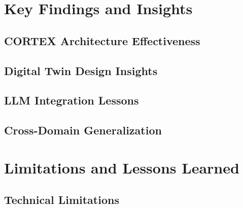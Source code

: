 \section{Key Findings and Insights}

\subsection{CORTEX Architecture Effectiveness}

\subsection{Digital Twin Design Insights}

\subsection{LLM Integration Lessons}

\subsection{Cross-Domain Generalization}

\section{Limitations and Lessons Learned}

\subsection{Technical Limitations}

